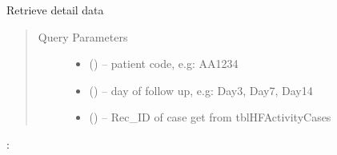 \documentclass[letterpaper,10pt,english,openany,oneside]{sphinxmanual}
\begin{document}
\begin{fulllineitems}
\label{\detokenize{api/v4:get--api4-HFFollowup-detail}}
\sphinxAtStartPar
Retrieve detail data
\begin{quote}\begin{description}
\item[{Query Parameters}] \leavevmode\begin{itemize}
\item {} 
\sphinxAtStartPar
{} () – patient code, e.g: AA1234

\item {} 
\sphinxAtStartPar
{} () – day of follow up, e.g: Day3, Day7, Day14

\item {} 
\sphinxAtStartPar
{} () – Rec\_ID of case get from tblHFActivityCases

\end{itemize}

\end{description}\end{quote}

\sphinxAtStartPar
{}:


\end{fulllineitems}
\end{document}
